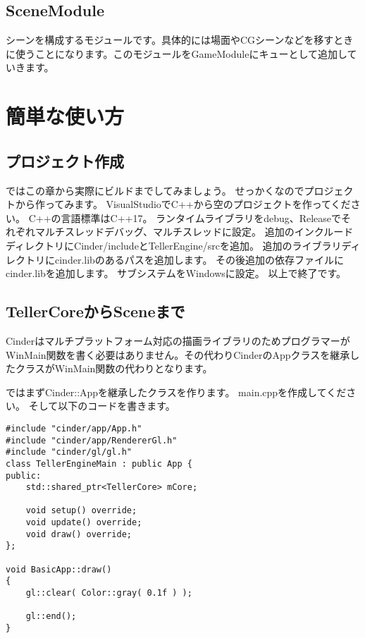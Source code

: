\documentclass[12pt,a4j,uplatex]{jsarticle}
\begin{document}
\subsection{SceneModule}
シーンを構成するモジュールです。具体的には場面やCGシーンなどを移すときに使うことになります。このモジュールをGameModuleにキューとして追加していきます。

\section{簡単な使い方}
\subsection{プロジェクト作成}
ではこの章から実際にビルドまでしてみましょう。
せっかくなのでプロジェクトから作ってみます。
VisualStudioでC++から空のプロジェクトを作ってください。
C++の言語標準はC++17。
ランタイムライブラリをdebug、Releaseでそれぞれマルチスレッドデバッグ、マルチスレッドに設定。
追加のインクルードディレクトリにCinder/includeとTellerEngine/srcを追加。
追加のライブラリディレクトリにcinder.libのあるパスを追加します。
その後追加の依存ファイルにcinder.libを追加します。
サブシステムをWindowsに設定。
以上で終了です。

\subsection{TellerCoreからSceneまで}
Cinderはマルチプラットフォーム対応の描画ライブラリのためプログラマーがWinMain関数を書く必要はありません。その代わりCinderのAppクラスを継承したクラスがWinMain関数の代わりとなります。

ではまずCinder::Appを継承したクラスを作ります。
main.cppを作成してください。
そして以下のコードを書きます。

\begin{lstlisting}[caption=hoge,label=fuga]
#include "cinder/app/App.h"
#include "cinder/app/RendererGl.h"
#include "cinder/gl/gl.h"
class TellerEngineMain : public App {
public:
	std::shared_ptr<TellerCore> mCore;

	void setup() override;
	void update() override;
	void draw() override;
};

void BasicApp::draw()
{
	gl::clear( Color::gray( 0.1f ) );

	gl::end();
}
\end{lstlisting}
\end{document}
